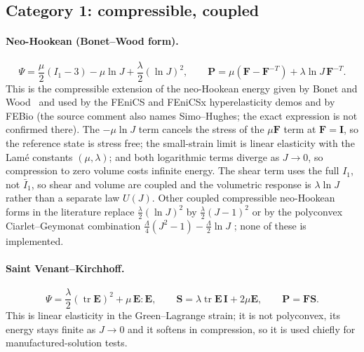 \documentclass[11pt]{article}
\newcommand{\tr}{\operatorname{tr}}
\newcommand{\bP}{\bm{P}}
\newcommand{\bS}{\bm{S}}
\newcommand{\bF}{\bm{F}}
\newcommand{\bE}{\bm{E}}
\newcommand{\bI}{\bm{I}}
\newcommand{\Ione}{I_1}
\newcommand{\Ib}{\bar{I}_1}
\begin{document}
\subsection{Category 1: compressible, coupled}
\label{sec:coupled}

\paragraph{Neo-Hookean (Bonet--Wood form).}
\begin{equation}
  \Psi = \frac{\mu}{2}(\Ione - 3) - \mu\ln J + \frac{\lambda}{2}(\ln J)^2,
  \qquad
  \bP = \mu(\bF - \bF^{-T}) + \lambda\ln J\,\bF^{-T} .
  \label{eq:nh}
\end{equation}
This is the compressible extension of the neo-Hookean energy given by
Bonet and Wood~\cite{bonetwood} and used by the FEniCS and FEniCSx
hyperelasticity demos and by FEBio (the source comment also names
Simo--Hughes; the exact expression is not confirmed there).  The
$-\mu\ln J$ term cancels the stress of the $\mu\bF$ term at $\bF = \bI$, so
the reference state is stress free; the small-strain limit is linear
elasticity with the Lam\'e constants $(\mu, \lambda)$; and both logarithmic
terms diverge as $J \to 0$, so compression to zero volume costs infinite
energy.  The shear term uses the full $\Ione$, not $\Ib$, so shear and
volume are coupled and the volumetric response is $\lambda\ln J$ rather
than a separate law $U(J)$.  Other coupled compressible neo-Hookean forms
in the literature replace $\tfrac{\lambda}{2}(\ln J)^2$ by
$\tfrac{\lambda}{2}(J-1)^2$ or by the polyconvex Ciarlet--Geymonat
combination $\tfrac{\Lambda}{4}(J^2 - 1) - \tfrac{\Lambda}{2}\ln J$
\cite{pencegou}; none of these is implemented.

\paragraph{Saint Venant--Kirchhoff.}
\begin{equation}
  \Psi = \frac{\lambda}{2}(\tr\bE)^2 + \mu\,\bE:\bE,
  \qquad
  \bS = \lambda\tr\bE\,\bI + 2\mu\bE,
  \qquad
  \bP = \bF\bS .
  \label{eq:svk}
\end{equation}
This is linear elasticity in the Green--Lagrange strain; it is not
polyconvex, its energy stays finite as $J \to 0$ and it softens in
compression, so it is used chiefly for manufactured-solution tests.
\end{document}
